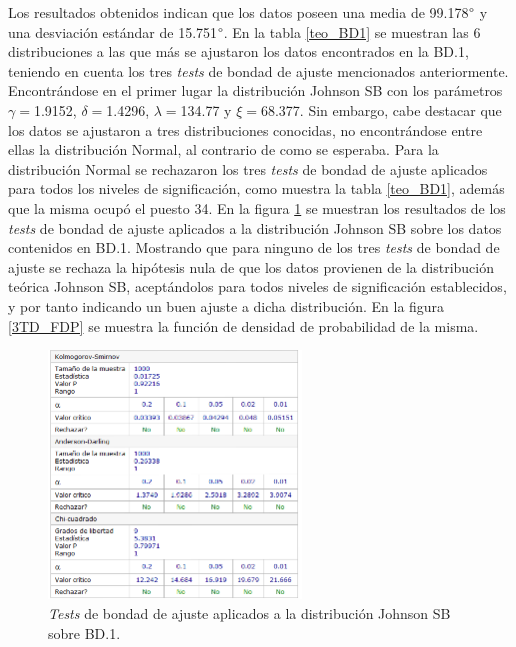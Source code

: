 \documentclass[12pt]{report}
\begin{document}
	 Los resultados obtenidos indican que los datos poseen una media de 99.178$\degree$ y una desviación estándar de 15.751$\degree$.
	 En la tabla \ref{teo_BD1}  se muestran las 6 distribuciones a las que más se ajustaron los datos encontrados en la BD.1, teniendo en cuenta los tres \textit{tests} de bondad de ajuste mencionados anteriormente. Encontrándose en el primer lugar la distribución Johnson SB con los parámetros $\gamma=$1.9152, $\delta=$1.4296, $\lambda=$134.77 y $\xi=$68.377. Sin embargo, cabe destacar que los datos se ajustaron a tres  distribuciones conocidas, no encontrándose entre ellas la distribución Normal, al contrario de como se esperaba. Para la distribución Normal se rechazaron los tres \textit{tests} de bondad de ajuste aplicados para todos los niveles de significación, como muestra la tabla \ref{teo_BD1}, además que la misma ocupó el puesto 34. En la figura \ref{3TD_BONDAD} se  muestran los resultados de los \textit{tests} de bondad de ajuste aplicados a la distribución Johnson SB sobre los datos contenidos en BD.1. Mostrando que para ninguno de los tres \textit{tests} de bondad de ajuste  se rechaza la hipótesis nula de que los datos provienen de la distribución teórica Johnson SB, aceptándolos para todos niveles de significación establecidos, y por tanto indicando un buen ajuste a dicha distribución. En la figura \ref{3TD_FDP}  se muestra la función de densidad de probabilidad de la misma.
	  	\begin{figure}[ht]
	  	\centering
	  	
 	  	\includegraphics[width=0.6\textwidth]{3td_BONDAD.png}
	  	\caption{\textit{Tests} de bondad de ajuste aplicados a la distribución Johnson SB sobre BD.1.}
	  	\label{3TD_BONDAD}
	  \end{figure}
	  
	  
	 
\end{document}
